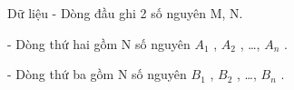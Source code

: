 Dữ liệu  
- Dòng đầu ghi 2 số nguyên M, N.  

   - Dòng thứ hai gồm N số nguyên $A_{1}$   , $A_{2}$   , …, $A_{n}$   .  

   - Dòng thứ ba gồm N số nguyên $B_{1}$   , $B_{2}$   , …, $B_{n}$   .